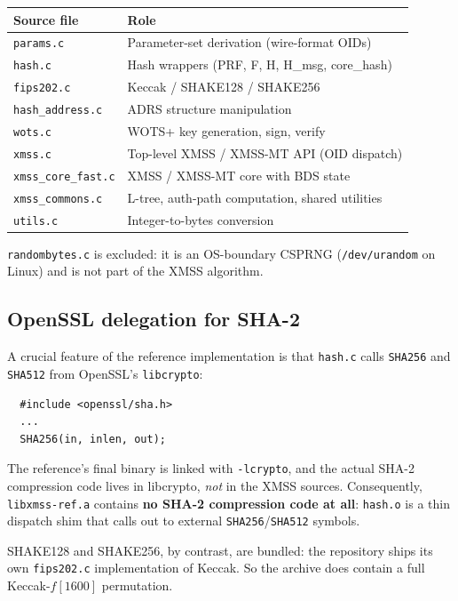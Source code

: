 \documentclass[11pt,a4paper]{article}
\begin{document}
\begin{center}
\begin{tabular}{@{}ll@{}}
\toprule
Source file & Role \\
\midrule
\texttt{params.c}           & Parameter-set derivation (wire-format OIDs) \\
\texttt{hash.c}             & Hash wrappers (PRF, F, H, H\_msg, core\_hash) \\
\texttt{fips202.c}          & Keccak / SHAKE128 / SHAKE256 \\
\texttt{hash\_address.c}    & ADRS structure manipulation \\
\texttt{wots.c}             & WOTS+ key generation, sign, verify \\
\texttt{xmss.c}             & Top-level XMSS / XMSS-MT API (OID dispatch) \\
\texttt{xmss\_core\_fast.c} & XMSS / XMSS-MT core with BDS state \\
\texttt{xmss\_commons.c}    & L-tree, auth-path computation, shared utilities \\
\texttt{utils.c}            & Integer-to-bytes conversion \\
\bottomrule
\end{tabular}
\end{center}

\texttt{randombytes.c} is excluded: it is an OS-boundary CSPRNG
(\texttt{/dev/urandom} on Linux) and is not part of the XMSS algorithm.

\subsection{OpenSSL delegation for SHA-2}
\label{sec:openssl}

A crucial feature of the reference implementation is that
\texttt{hash.c} calls \texttt{SHA256} and \texttt{SHA512} from OpenSSL's
\texttt{libcrypto}:

\begin{verbatim}
  #include <openssl/sha.h>
  ...
  SHA256(in, inlen, out);
\end{verbatim}

The reference's final binary is linked with \texttt{-lcrypto}, and the
actual SHA-2 compression code lives in libcrypto, \emph{not} in the
XMSS sources.  Consequently, \texttt{libxmss-ref.a} contains
\textbf{no SHA-2 compression code at all}: \texttt{hash.o} is a thin
dispatch shim that calls out to external \texttt{SHA256}/\texttt{SHA512}
symbols.

SHAKE128 and SHAKE256, by contrast, are bundled: the repository ships
its own \texttt{fips202.c} implementation of Keccak.  So the archive
does contain a full Keccak-$f[1600]$ permutation.
\end{document}
